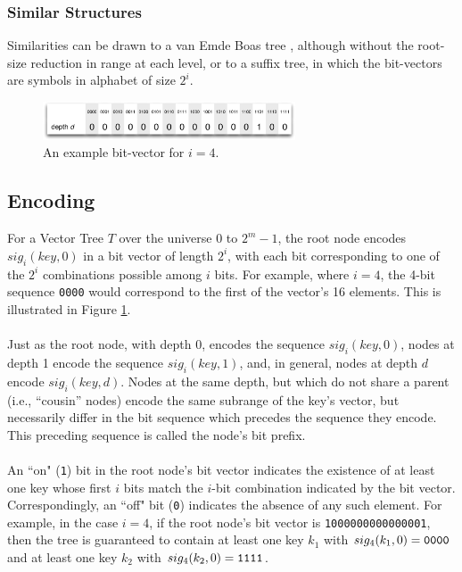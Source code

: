 \documentclass[11pt,letterpaper]{article}
\begin{document}
\subsubsection{Similar Structures}
Similarities can be drawn to a van Emde Boas tree \cite{wiki:001},
although without the root-size reduction in range at each level, or to a suffix tree, in
which the bit-vectors are symbols in alphabet of size $2^i$.

\begin{figure}[t]
\center
\includegraphics[width=75mm]{example-vector.pdf}
\caption{An example bit-vector for $i=4$.}
\label{fig:example-vector}
\end{figure}

\subsection{Encoding}
For a Vector Tree $T$ over the universe $0$ to $2^m - 1$, the root node
encodes $sig_i(key, 0)$ in a bit vector of length $2^i$,
with each bit corresponding to one of the $2^i$ combinations possible
among $i$ bits.  For example, where $i=4$, the 4-bit sequence {\tt 0000}
would correspond to the first of the vector's 16 elements.  This is illustrated
in Figure \ref{fig:example-vector}.

\paragraph{}
Just as the root node, with depth 0, encodes the sequence $sig_i(key, 0)$,
nodes at depth 1 encode the sequence $sig_i(key, 1)$, and,
in general, nodes at depth $d$ encode $sig_i(key, d)$.  Nodes at the
same depth, but which do not share a parent (i.e., ``cousin'' nodes)
encode the same subrange of the key's vector, but necessarily differ
in the bit sequence which precedes the sequence they encode.  This
preceding sequence is called the node's bit prefix.

\paragraph{}
An ``on" ({\tt 1}) bit in the root node's bit vector indicates the existence
of at least one key whose first $i$ bits match the $i$-bit combination
indicated by the bit vector.  Correspondingly, an ``off" bit ({\tt 0}) indicates
the absence of any such element.  For example, in the case $i=4$,
if the root node's bit vector is {\tt 1000000000000001}, then the tree is
guaranteed to contain at least one key $k_1$ with $sig_4(k_1, 0) = {\tt 0000}$
and at least one key $k_2$ with $sig_4(k_2, 0)={\tt 1111}$.
\end{document}
